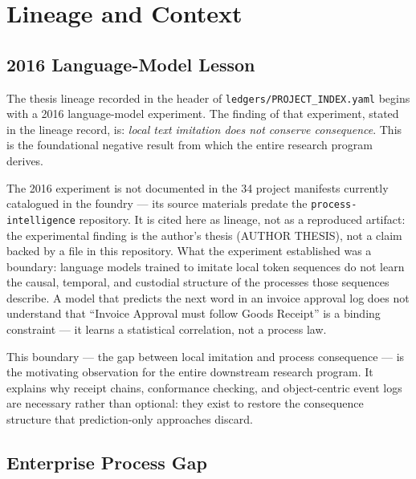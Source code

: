 
\section{Lineage and Context}
\label{sec:phd-thesis-lineage}

\subsection{2016 Language-Model Lesson}
\label{sec:phd-thesis-lineage-2016}

The thesis lineage recorded in the header of \texttt{ledgers/PROJECT\_INDEX.yaml} begins with
a 2016 language-model experiment. The finding of that experiment, stated in the lineage
record, is: \emph{local text imitation does not conserve consequence}. This is the
foundational negative result from which the entire research program derives.

The 2016 experiment is not documented in the 34 project manifests currently catalogued in the
foundry --- its source materials predate the \texttt{process-intelligence} repository. It is
cited here as lineage, not as a reproduced artifact: the experimental finding is the author's
thesis (AUTHOR THESIS), not a claim backed by a file in this repository. What the experiment
established was a boundary: language models trained to imitate local token sequences do not
learn the causal, temporal, and custodial structure of the processes those sequences describe.
A model that predicts the next word in an invoice approval log does not understand that
``Invoice Approval must follow Goods Receipt'' is a binding constraint --- it learns a
statistical correlation, not a process law.

This boundary --- the gap between local imitation and process consequence --- is the
motivating observation for the entire downstream research program. It explains why receipt
chains, conformance checking, and object-centric event logs are necessary rather than
optional: they exist to restore the consequence structure that prediction-only approaches
discard.

\subsection{Enterprise Process Gap}
\label{sec:phd-thesis-lineage-gap}

